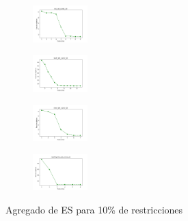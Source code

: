 \begin{figure}[H]
\begin{subfigure}
    \end{subfigure}
    \hfill
    \begin{subfigure}
        \centering
        \includegraphics[width=0.234\textwidth]{img/es/iris_set_const_10_3773969821_cost.png}
    \end{subfigure}
    \hfill
    \begin{subfigure}
        \centering
        \includegraphics[width=0.234\textwidth]{img/es/ecoli_set_const_10_3773969821_cost.png}
    \end{subfigure}
    \hfill
    \begin{subfigure}
        \centering
        \includegraphics[width=0.234\textwidth]{img/es/rand_set_const_10_3773969821_cost.png}
    \end{subfigure}
    \hfill
    \begin{subfigure}
        \centering
        \includegraphics[width=0.234\textwidth]{img/es/newthyroid_set_const_10_3773969821_cost.png}
    \end{subfigure}
    \caption{Agregado de ES para 10\% de restricciones}
\end{figure}


\vspace*{\fill}
\newpage
\vspace*{\fill}

